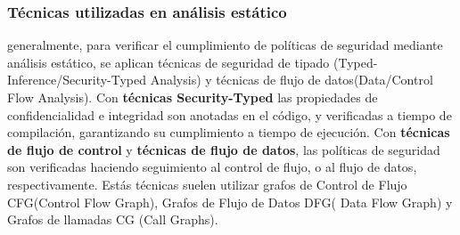 \subsubsection{Técnicas utilizadas en análisis estático} 
generalmente, para verificar el cumplimiento de políticas de seguridad mediante
análisis estático, se aplican técnicas de seguridad de tipado
(Typed-Inference/Security-Typed Analysis) y técnicas de flujo de
datos(Data/Control Flow Analysis)\cite{Information-Flow-Java}.\newline 
Con \textbf{técnicas Security-Typed} las propiedades de confidencialidad e
integridad son anotadas en el código, y verificadas a tiempo de compilación,
garantizando su cumplimiento a tiempo de ejecución.\newline 
Con \textbf{técnicas de flujo de control} y \textbf{técnicas de flujo de datos},
las políticas de seguridad son verificadas haciendo seguimiento al control de
flujo, o al flujo de datos, respectivamente. Estás técnicas suelen utilizar
grafos de Control de Flujo CFG(Control Flow Graph), Grafos de Flujo de Datos
DFG( Data Flow Graph) y Grafos de llamadas CG (Call Graphs).

